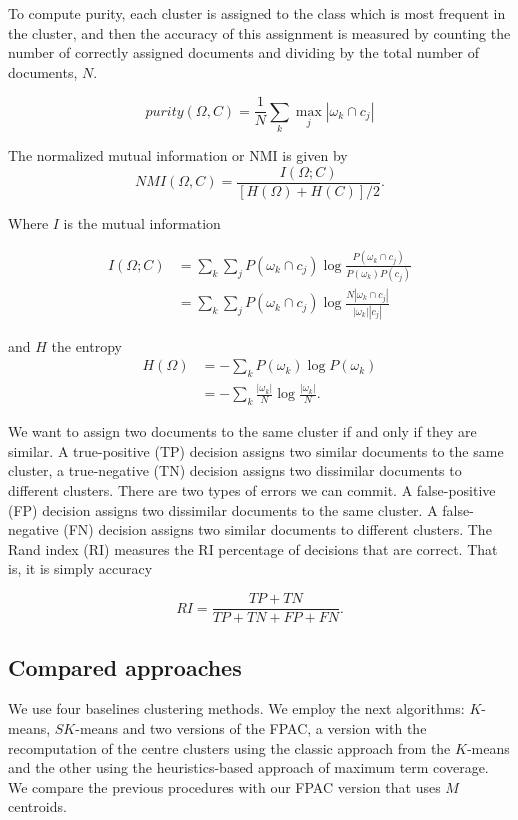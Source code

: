 \documentclass[runningheads]{llncs}
\begin{document}
To compute purity, each cluster is assigned to the class which is most frequent
in the cluster, and then the accuracy of this assignment is measured
by counting the number of correctly assigned documents and dividing by the total number of documents, $N$.

\[
purity(\Omega, C) = \frac{1}{N} \sum_k \max_j |\omega_k \cap c_j|
\]


The normalized mutual information or NMI is given by
\[
NMI(\Omega, C) = \frac{I(\Omega; C)}{[H(\Omega) + H(C)] / 2}.
\]

Where $I$ is the mutual information

\[
\begin{split}
I(\Omega; C) &= \sum_k\sum_j P(\omega_k \cap c_j)\log\frac{P(\omega_k \cap c_j)}{P(\omega_k)P(c_j)}\\
&= \sum_k\sum_j P(\omega_k \cap c_j)\log\frac{N|\omega_k \cap c_j|}{|\omega_k||c_j|}
\end{split}
\]

and $H$ the entropy
\[
\begin{split}
H(\Omega) &= - \sum_k P(\omega_k) \log P(\omega_k)\\
&= - \sum_k \frac{|\omega_k|}{N} \log \frac{|\omega_k|}{N}.
\end{split}
\]

We want to assign two documents to the same
cluster if and only if they are similar. A true-positive (TP) decision assigns
two similar documents to the same cluster, a true-negative (TN) decision assigns
two dissimilar documents to different clusters. There are two types of
errors we can commit. A false-positive (FP) decision assigns two dissimilar
documents to the same cluster. A false-negative (FN) decision assigns two
similar documents to different clusters. The Rand index (RI) measures the RI
percentage of decisions that are correct. That is, it is simply accuracy

\[
RI = \frac{TP + TN}{TP + TN + FP + FN}.
\]


\subsection{Compared approaches}


We use four baselines clustering methods. We employ the next algorithms: 
$K$-means, $SK$-means and two versions of the FPAC, a version with
the recomputation of the centre clusters using the classic approach from
the $K$-means and the other using the heuristics-based approach of maximum
term coverage. We compare the previous procedures with our FPAC version
that uses $M$ centroids.
\end{document}

